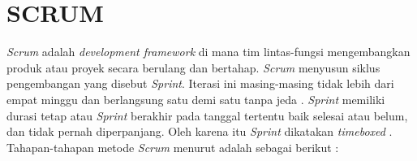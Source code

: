 \section{SCRUM}
\textit{Scrum} adalah \textit{development framework} di mana tim lintas-fungsi mengembangkan produk atau proyek secara berulang dan bertahap. \textit{Scrum} menyusun siklus pengembangan yang disebut \textit{Sprint}. Iterasi ini masing-masing tidak lebih dari empat minggu dan berlangsung satu demi satu tanpa jeda \citep{deemer2012lightweight}. \textit{Sprint} memiliki durasi tetap atau \textit{Sprint} berakhir pada tanggal tertentu baik selesai atau belum, dan tidak pernah diperpanjang. Oleh karena itu \textit{Sprint} dikatakan \textit{timeboxed} \citep{schwaber2011scrum}. Tahapan-tahapan metode \textit{Scrum} menurut \citep{schwaber2011scrum} adalah sebagai berikut :


